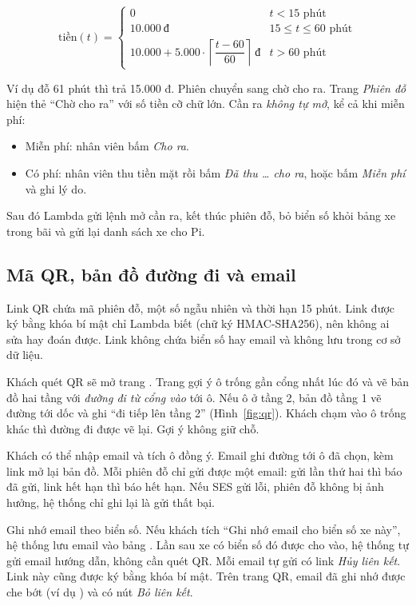 \[
\text{tiền}(t) =
\begin{cases}
0 & t < 15 \text{ phút}\\
10.000\ \text{đ} & 15 \leq t \leq 60 \text{ phút}\\
10.000 + 5.000 \cdot \left\lceil \dfrac{t-60}{60} \right\rceil\ \text{đ} & t > 60 \text{ phút}
\end{cases}
\]

Ví dụ đỗ 61 phút thì trả 15.000 đ. Phiên chuyển sang chờ cho ra. Trang \emph{Phiên đỗ} hiện thẻ ``Chờ cho ra'' với số tiền cỡ chữ lớn. Cần ra \emph{không tự mở}, kể cả khi miễn phí:
\begin{itemize}
  \item Miễn phí: nhân viên bấm \emph{Cho ra}.
  \item Có phí: nhân viên thu tiền mặt rồi bấm \emph{Đã thu \ldots{} cho ra}, hoặc bấm \emph{Miễn phí} và ghi lý do.
\end{itemize}
Sau đó Lambda gửi lệnh mở cần ra, kết thúc phiên đỗ, bỏ biển số khỏi bảng xe trong bãi và gửi lại danh sách xe cho Pi.

\subsection{Mã QR, bản đồ đường đi và email}

Link QR chứa mã phiên đỗ, một số ngẫu nhiên và thời hạn 15 phút. Link được ký bằng khóa bí mật chỉ Lambda biết (chữ ký HMAC-SHA256), nên không ai sửa hay đoán được. Link không chứa biển số hay email và không lưu trong cơ sở dữ liệu.

Khách quét QR sẽ mở trang . Trang gợi ý ô trống gần cổng nhất lúc đó và vẽ bản đồ hai tầng với \emph{đường đi từ cổng vào} tới ô. Nếu ô ở tầng 2, bản đồ tầng 1 vẽ đường tới dốc và ghi ``đi tiếp lên tầng 2'' (Hình~\ref{fig:qr}). Khách chạm vào ô trống khác thì đường đi được vẽ lại. Gợi ý không giữ chỗ.

Khách có thể nhập email và tích ô đồng ý. Email ghi đường tới ô đã chọn, kèm link mở lại bản đồ. Mỗi phiên đỗ chỉ gửi được một email: gửi lần thứ hai thì báo đã gửi, link hết hạn thì báo hết hạn. Nếu SES gửi lỗi, phiên đỗ không bị ảnh hưởng, hệ thống chỉ ghi lại là gửi thất bại.

Ghi nhớ email theo biển số. Nếu khách tích ``Ghi nhớ email cho biển số xe này'', hệ thống lưu email vào bảng . Lần sau xe có biển số đó được cho vào, hệ thống tự gửi email hướng dẫn, không cần quét QR. Mỗi email tự gửi có link \emph{Hủy liên kết}. Link này cũng được ký bằng khóa bí mật. Trên trang QR, email đã ghi nhớ được che bớt (ví dụ ) và có nút \emph{Bỏ liên kết}.

